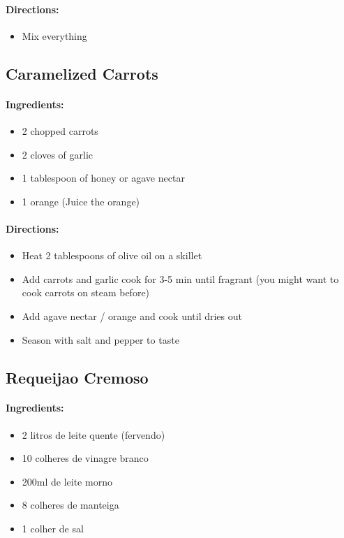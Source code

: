 \documentclass{article}
\begin{document}
\paragraph{Directions:}
\begin{itemize}
    \item Mix everything
\end{itemize}

\subsection{Caramelized Carrots}

\paragraph{Ingredients:}
\begin{itemize}
    \item 2 chopped carrots
    \item 2 cloves of garlic
    \item 1 tablespoon of honey or agave nectar
    \item 1 orange (Juice the orange)
\end{itemize}

\paragraph{Directions:}
\begin{itemize}
    \item Heat 2 tablespoons of olive oil on a skillet
    \item Add carrots and garlic cook for 3-5 min until fragrant (you might want to cook carrots on steam before)
    \item Add agave nectar / orange and cook until dries out
    \item Season with salt and pepper to taste
\end{itemize}

\subsection{Requeijao Cremoso}

\paragraph{Ingredients:}
\begin{itemize}
    \item 2 litros de leite quente (fervendo)
    \item 10 colheres de vinagre branco
    \item 200ml de leite morno
    \item 8 colheres de manteiga
    \item 1 colher de sal
\end{itemize}
\end{document}

